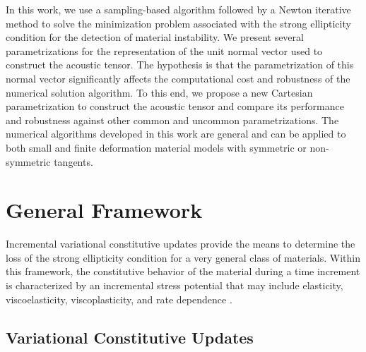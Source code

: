 \documentclass[12pt]{article}
\numberwithin{equation}{section}
\begin{document}
In this work, we use a sampling-based algorithm followed by a Newton
iterative method to solve the minimization problem associated with the
strong ellipticity condition for the detection of material
instability. We present several parametrizations for the
representation of the unit normal vector used to construct the
acoustic tensor. The hypothesis is that the parametrization of this
normal vector significantly affects the computational cost and
robustness of the numerical solution algorithm. To this end, we
propose a new Cartesian parametrization to construct the acoustic
tensor and compare its performance and robustness against other common
and uncommon parametrizations. The numerical algorithms developed in
this work are general and can be applied to both small and finite
deformation material models with symmetric or non-symmetric tangents.

\section{General Framework}

Incremental variational constitutive updates provide the means to
determine the loss of the strong ellipticity condition for a very
general class of materials. Within this framework, the constitutive
behavior of the material during a time increment is characterized by
an incremental stress potential that may include elasticity,
viscoelasticity, viscoplasticity, and rate dependence
\citep{Ortiz.Stainier:1999, Lambrecht.etal:2003, Miehe.etal:2004,
  Weinberg.etal:2006, Fancello.etal:2006, Mosler.Bruhns:2010,
  Bleier.Mosler:2012}.

\subsection{Variational Constitutive Updates}
\end{document}
